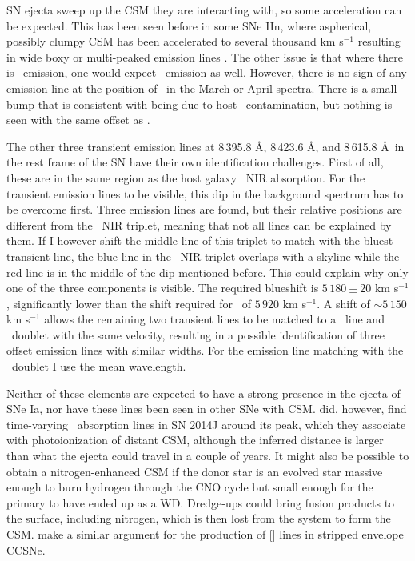 \documentclass[a4paper,oneside,12pt, class=Latex/Classes/PhDthesisPSnPDF, crop=false]{standalone}
\begin{document}
SN ejecta sweep up the CSM they are interacting with, so some acceleration can be expected. This has been seen before in some SNe IIn, where aspherical, possibly clumpy CSM has been accelerated to several thousand km s$^{-1}$ resulting in wide boxy or multi-peaked emission lines \citep{1998S_aspherical_CSM, 1998S_late-time, PTF11iqb}. The other issue is that where there is \Hbeta\ emission, one would expect \Halpha\ emission as well. However, there is no sign of any emission line at the position of \Halpha\ in the March or April spectra. There is a small bump that is consistent with being due to host \Halpha\ contamination, but nothing is seen with the same offset as \Hbeta.

The other three transient emission lines at 8\,395.8 \AA,  8\,423.6 \AA, and 8\,615.8 \AA\ in the rest frame of the SN  have their own identification challenges. First of all, these are in the same region as the host galaxy \CaII\ NIR absorption. For the transient emission lines to be visible, this dip in the background spectrum has to be overcome first. Three emission lines are found, but their relative positions are different from the \CaII\ NIR triplet, meaning that not all lines can be explained by them. If I however shift the middle line of this triplet to match with the bluest transient line, the blue line in the \CaII\ NIR triplet overlaps with a skyline while the red line is in the middle of the dip mentioned before. This could explain why only one of the three components is visible. The required blueshift is $5\,180\pm20$ km s$^{-1}$, significantly lower than the shift required for \Hbeta\ of $5\,920$ km s$^{-1}$. A shift of $\sim5\,150$ km s$^{-1}$ allows the remaining two transient lines to be matched to a \NI\ line and \KI\ doublet with the same velocity, resulting in a possible identification of three offset emission lines with similar widths. For the emission line matching with the \KI\ doublet I use the mean wavelength.

Neither of these elements are expected to have a strong presence in the ejecta of SNe Ia, nor have these lines been seen in other SNe with CSM. \citet{2014J_KI} did, however, find time-varying \KI\ absorption lines in SN 2014J around its peak, which they associate with photoionization of distant CSM, although the inferred distance is larger than what the ejecta could travel in a couple of years. It might also be possible to obtain a nitrogen-enhanced CSM if the donor star is an evolved star massive enough to burn hydrogen through the CNO cycle but small enough for the primary to have ended up as a WD. Dredge-ups could bring fusion products to the surface, including nitrogen, which is then lost from the system to form the CSM. \citet{N_lines_SECCSN} make a similar argument for the production of [\NII] lines in stripped envelope CCSNe.
\end{document}
